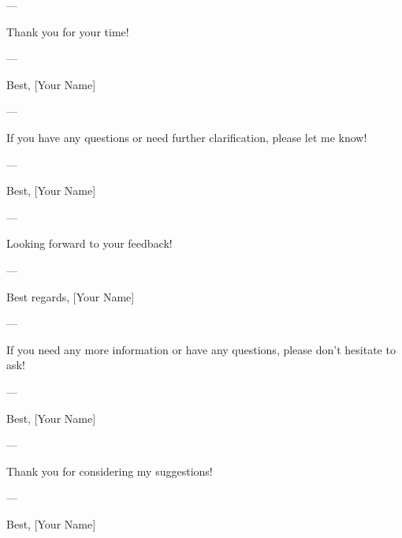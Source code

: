 --- 

Thank you for your time! 

--- 

Best,  
[Your Name]  

--- 

If you have any questions or need further clarification, please let me know! 

--- 

Best,  
[Your Name]  

--- 

Looking forward to your feedback! 

--- 

Best regards,  
[Your Name]  

--- 

If you need any more information or have any questions, please don't hesitate to ask! 

--- 

Best,  
[Your Name]  

--- 

Thank you for considering my suggestions! 

--- 

Best,  
[Your Name]